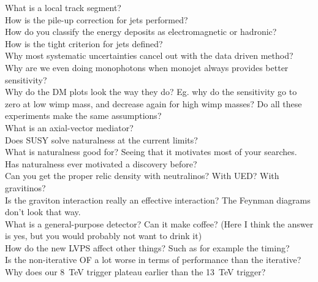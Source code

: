 \documentclass[a4paper,10pt,twoside,notitlepage]{article}
\begin{document}
\begin{description}
\item[What is a local track segment?]

\item[How is the pile-up correction for jets performed?]

\item[How do you classify the energy deposits as electromagnetic or hadronic?]

\item[How is the tight criterion for jets defined?]

\item[Why most systematic uncertainties cancel out with the data driven method?]

\item[Why are we even doing monophotons when monojet always provides better
  sensitivity?]

\item[Why do the DM plots look the way they do? Eg. why do the sensitivity go to
  zero at low wimp mass, and decrease again for high wimp masses? Do all these
  experiments make the same assumptions?]

\item[What is an axial-vector mediator?]

\item[Does SUSY solve naturalness at the current limits?]

\item[What is naturalness good for? Seeing that it motivates most of your
  searches. Has naturalness ever motivated a discovery before?]

\item[Can you get the proper relic density with neutralinos? With UED? With
  gravitinos?]

\item[Is the graviton interaction really an effective interaction? The Feynman
  diagrams don’t look that way.]

\item[What is a general-purpose detector? Can it make coffee? (Here I think the
  answer is yes, but you would probably not want to drink it)]

\item[How do the new LVPS affect other things? Such as for example the timing?]

\item[Is the non-iterative OF a lot worse in terms of performance than the
  iterative?]

\item[Why does our 8~TeV trigger plateau earlier than the 13~TeV trigger?]


\end{description}
\end{document}
